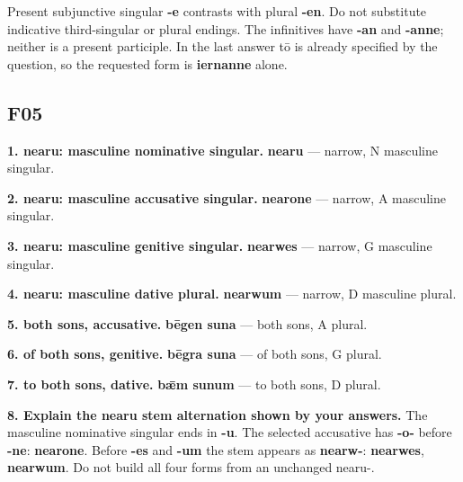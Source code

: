 Present subjunctive singular \textbf{-e} contrasts with plural \textbf{-en}. Do not substitute indicative third-singular or plural endings. The infinitives have \textbf{-an} and \textbf{-anne}; neither is a present participle. In the last answer tō is already specified by the question, so the requested form is \textbf{iernanne} alone.

\subsection*{F05}

\textbf{1. nearu: masculine nominative singular.} \textbf{nearu} — narrow, N masculine singular.

\textbf{2. nearu: masculine accusative singular.} \textbf{nearone} — narrow, A masculine singular.

\textbf{3. nearu: masculine genitive singular.} \textbf{nearwes} — narrow, G masculine singular.

\textbf{4. nearu: masculine dative plural.} \textbf{nearwum} — narrow, D masculine plural.

\textbf{5. both sons, accusative.} \textbf{bēgen suna} — both sons, A plural.

\textbf{6. of both sons, genitive.} \textbf{bēgra suna} — of both sons, G plural.

\textbf{7. to both sons, dative.} \textbf{bǣm sunum} — to both sons, D plural.

\textbf{8. Explain the nearu stem alternation shown by your answers.} The masculine nominative singular ends in \textbf{-u}. The selected accusative has \textbf{-o-} before \textbf{-ne}: \textbf{nearone}. Before \textbf{-es} and \textbf{-um} the stem appears as \textbf{nearw-}: \textbf{nearwes}, \textbf{nearwum}. Do not build all four forms from an unchanged nearu-.

